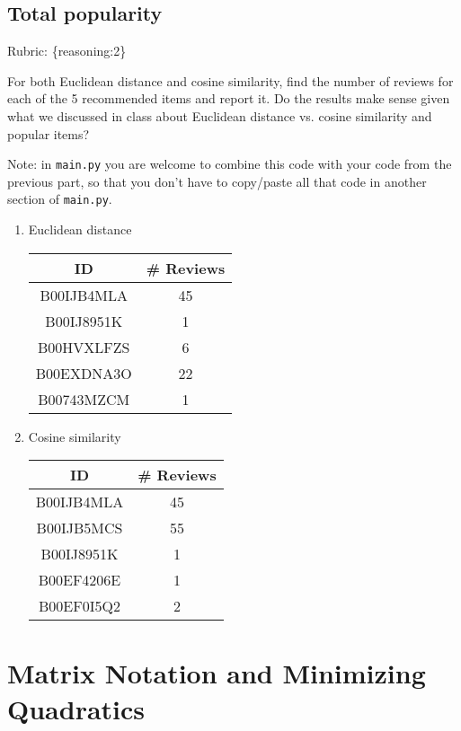 \documentclass{article}
\def\rubric#1{\gre{Rubric: \{#1\}}}{}
\def\blu#1{{\color{blu}#1}}
\def\gre#1{{\color{gre}#1}}
\begin{document}
\subsection{Total popularity}
\rubric{reasoning:2}

\blu{For both Euclidean distance and cosine similarity, find the number of reviews for each of the 5 recommended items and report it. Do the results make sense given what we discussed in class about Euclidean distance vs. cosine similarity and popular items?}

Note: in \texttt{main.py} you are welcome to combine this code with your code from the previous part, so that you don't have to copy/paste all that code in another section of \texttt{main.py}.
\begin{enumerate}\color{ans}
\item Euclidean distance
    \scriptsize
    \setlength{\tabcolsep}{10pt}
    \begin{center}
    \begin{tabular}{SS} \toprule
        {ID} & {\# Reviews} \\ \midrule
        {B00IJB4MLA} & 45 \\ 
        {B00IJ8951K} & 1 \\ 
        {B00HVXLFZS} & 6 \\ 
        {B00EXDNA3O} & 22 \\ 
        {B00743MZCM} & 1 \\ \bottomrule
    \end{tabular}
    \end{center}
    \normalsize
\item Cosine similarity
    \scriptsize
    \setlength{\tabcolsep}{10pt}
    \begin{center}
    \begin{tabular}{SS} \toprule
        {ID} & {\# Reviews} \\ \midrule
        {B00IJB4MLA} & 45 \\ 
        {B00IJB5MCS} & 55 \\ 
        {B00IJ8951K} & 1 \\ 
        {B00EF4206E} & 1 \\ 
        {B00EF0I5Q2} & 2 \\ \bottomrule
    \end{tabular}
    \end{center}
    \normalsize
\end{enumerate}

\section{Matrix Notation and Minimizing Quadratics}
\end{document}
